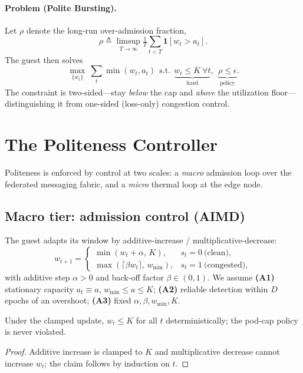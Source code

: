 \paragraph{Problem (Polite Bursting).}
Let $\rho$ denote the long-run over-admission fraction,
\begin{equation}
\rho \triangleq \limsup_{T\to\infty}\tfrac1T\textstyle\sum_{t<T}\mathbf 1[w_t>a_t].
\end{equation}
The guest then solves
\begin{equation}
\max_{\{w_t\}}\ \sum_t \min(w_t,a_t)\ \ \text{s.t.}\ \
\underbrace{w_t\le K\ \forall t}_{\text{hard}},\ \
\underbrace{\rho \le \epsilon}_{\text{policy}}.
\end{equation}
The constraint is two-sided---stay \emph{below} the cap and \emph{above} the
utilization floor---distinguishing it from one-sided (loss-only) congestion control.

\section{The Politeness Controller}
\label{sec:controller}
Politeness is enforced by control at two scales: a \emph{macro} admission loop
over the federated messaging fabric, and a \emph{micro} thermal loop at the edge node.

\subsection{Macro tier: admission control (AIMD)}
The guest adapts its window by additive-increase / multiplicative-decrease:
\begin{equation}
w_{t+1}=
\begin{cases}
\min(w_t+\alpha,\,K), & s_t=0\ \text{(clean)},\\[2pt]
\max(\lceil\beta w_t\rceil,\,w_{\min}), & s_t=1\ \text{(congested)},
\end{cases}
\end{equation}
with additive step $\alpha>0$ and back-off factor $\beta\in(0,1)$.
We assume \textbf{(A1)} stationary capacity $a_t\equiv a$, $w_{\min}\le a\le K$;
\textbf{(A2)} reliable detection within $D$ epochs of an overshoot; \textbf{(A3)}
fixed $\alpha,\beta,w_{\min},K$.

\begin{proposition}\label{prop:safety}
Under the clamped update, $w_t\le K$ for all $t$ deterministically; the pod-cap
policy is never violated.
\end{proposition}
\begin{proof}
Additive increase is clamped to $K$ and multiplicative decrease cannot increase
$w_t$; the claim follows by induction on $t$.
\end{proof}

